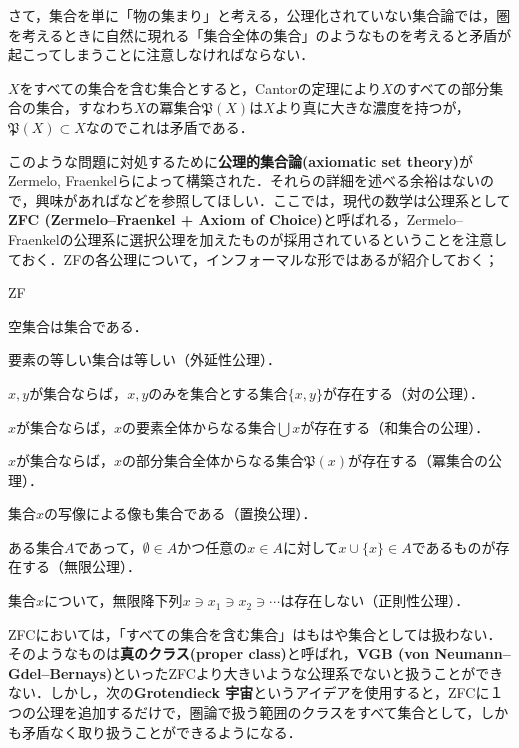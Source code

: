 \begin{tightcurve}
	
さて，集合を単に「物の集まり」と考える，公理化されていない集合論では，圏を考えるときに自然に現れる「集合全体の集合」のようなものを考えると矛盾が起こってしまうことに注意しなければならない．

\begin{surex}[Cantorのパラドックス]
	$X$をすべての集合を含む集合とすると，Cantorの定理により$X$のすべての部分集合の集合，すなわち$X$の冪集合$\mathfrak{P}(X)$は$X$より真に大きな濃度を持つが，$\mathfrak{P}(X)\subset X$なのでこれは矛盾である．
\end{surex}

このような問題に対処するために\textbf{公理的集合論(axiomatic set theory)}がZermelo, Fraenkelらによって構築された．それらの詳細を述べる余裕はないので，興味があれば\cite{Kunen2009}などを参照してほしい．ここでは，現代の数学は公理系として\textbf{ZFC (Zermelo--Fraenkel + Axiom of Choice)}と呼ばれる，Zermelo--Fraenkelの公理系に選択公理を加えたものが採用されているということを注意しておく．ZFの各公理について，インフォーマルな形ではあるが紹介しておく；

\begin{defiterm}{ZF}
	\item 空集合は集合である．
	\item 要素の等しい集合は等しい（外延性公理）．
	\item $x,y$が集合ならば，$x,y$のみを集合とする集合$\{x,y\}$が存在する（対の公理）．
	\item $x$が集合ならば，$x$の要素全体からなる集合$\bigcup x$が存在する（和集合の公理）．
	\item $x$が集合ならば，$x$の部分集合全体からなる集合$\mathfrak{P}(x)$が存在する（冪集合の公理）．
	\item 集合$x$の写像による像も集合である（置換公理）．
	\item ある集合$A$であって，$\emptyset\in A$かつ任意の$x\in A$に対して$x\cup\{x\}\in A$であるものが存在する（無限公理）．
	\item 集合$x$について，無限降下列$x\ni x_1\ni x_2\ni\cdots$は存在しない（正則性公理）．
\end{defiterm}

ZFCにおいては，「すべての集合を含む集合」はもはや集合としては扱わない．そのようなものは\textbf{真のクラス(proper class)}と呼ばれ，\textbf{VGB (von Neumann--Gdel--Bernays)}といったZFCより大きいような公理系でないと扱うことができない．しかし，次の\textbf{Grotendieck 宇宙}というアイデアを使用すると，ZFCに１つの公理を追加するだけで，圏論で扱う範囲のクラスをすべて集合として，しかも矛盾なく取り扱うことができるようになる．


\end{tightcurve}
